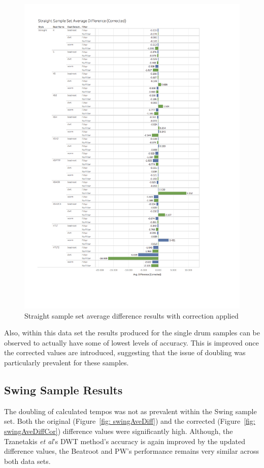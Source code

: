 \documentclass[a4paper, 11pt]{article}
\begin{document}
\begin{figure}[htbp]
\centering
\includegraphics[scale=0.38]{images/SSSADC.jpg}
\caption{Straight sample set average difference results with correction applied}
\label{fig: stradAveDiffCor}
\end{figure}

Also, within this data set the results produced for the single drum samples can be observed to actually have some of lowest levels of accuracy. This is improved once the corrected values are introduced, suggesting that the issue of doubling was particularly prevalent for these samples. 

\subsection{Swing Sample Results}
The doubling of calculated tempos was not as prevalent within the Swing sample set. Both the original (Figure~\ref{fig: swingAveDiff}) and the corrected (Figure~\ref{fig: swingAveDiffCor}) difference values were significantly high. Although, the Tzanetakis \textit{et al}'s \cite{tzane1} DWT method's accuracy is again improved by the updated difference values, the Beatroot and PW's performance remains very similar across both data sets.
\end{document}
